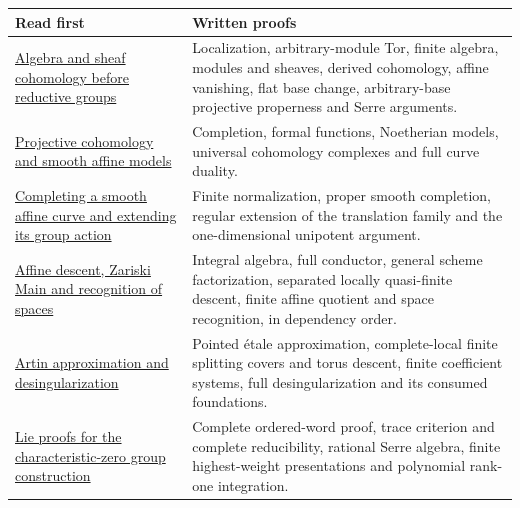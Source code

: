 \documentclass[11pt,a4paper,openany]{report}
\newcounter{none}
\begin{document}
{\def\LTcaptype{none} %
\begin{longtable}[]{@{}
  >{\raggedright\arraybackslash}p{}
  >{\raggedright\arraybackslash}p{}@{}}
\toprule\noalign{}
\begin{minipage}[b]{\linewidth}\raggedright
Read first
\end{minipage} & \begin{minipage}[b]{\linewidth}\raggedright
Written proofs
\end{minipage} \\
\midrule\noalign{}
\endhead
\bottomrule\noalign{}
\endlastfoot
\href{https://github.com/KokunoYumeto/open-math-courses/blob/main/docs/courses/AG-RG/AG-RG-S01.md}{Algebra and sheaf cohomology before reductive groups} & Localization, arbitrary-module Tor, finite algebra, modules and sheaves, derived cohomology, affine vanishing, flat base change, arbitrary-base projective properness and Serre arguments. \\
\href{https://github.com/KokunoYumeto/open-math-courses/blob/main/docs/courses/AG-RG/AG-RG-S02.md}{Projective cohomology and smooth affine models} & Completion, formal functions, Noetherian models, universal cohomology complexes and full curve duality. \\
\href{https://github.com/KokunoYumeto/open-math-courses/blob/main/docs/courses/AG-RG/AG-RG-S03.md}{Completing a smooth affine curve and extending its group action} & Finite normalization, proper smooth completion, regular extension of the translation family and the one-dimensional unipotent argument. \\
\href{https://github.com/KokunoYumeto/open-math-courses/blob/main/docs/courses/AG-RG/AG-RG-S04.md}{Affine descent, Zariski Main and recognition of spaces} & Integral algebra, full conductor, general scheme factorization, separated locally quasi-finite descent, finite affine quotient and space recognition, in dependency order. \\
\href{https://github.com/KokunoYumeto/open-math-courses/blob/main/docs/courses/AG-RG/AG-RG-S05.md}{Artin approximation and desingularization} & Pointed étale approximation, complete-local finite splitting covers and torus descent, finite coefficient systems, full desingularization and its consumed foundations. \\
\href{https://github.com/KokunoYumeto/open-math-courses/blob/main/docs/courses/AG-RG/AG-RG-S06.md}{Lie proofs for the characteristic-zero group construction} & Complete ordered-word proof, trace criterion and complete reducibility, rational Serre algebra, finite highest-weight presentations and polynomial rank-one integration. \\

\end{longtable}}
\end{document}
